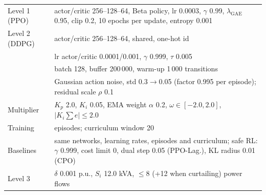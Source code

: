 \begin{tabular}{@{}l>{\raggedright\arraybackslash}p{}@{}}
\toprule
Level 1 (PPO) & actor/critic 256--128--64, Beta policy, lr 0.0003, $\gamma$ 0.99, $\lambda_{\mathrm{GAE}}$ 0.95, clip 0.2, 10 epochs per update, entropy 0.001 \\
Level 2 (DDPG) & actor/critic 256--128--64, shared, one-hot id \\
 & lr actor/critic 0.0001/0.001, $\gamma$ 0.999, $\tau$ 0.005 \\
 & batch 128, buffer 200\,000, warm-up 1\,000 transitions \\
 & Gaussian action noise, std 0.3$\to$0.05 (factor 0.995 per episode); residual scale $\rho$ 0.1 \\
Multiplier & $K_p$ 2.0, $K_i$ 0.05, EMA weight $\alpha$ 0.2, $\omega\in[-2.0, 2.0]$, $|K_i\textstyle\sum e|\le2.0$ \\
Training & 600 episodes; curriculum window 20 \\
Baselines & same networks, learning rates, episodes and curriculum; safe RL: $\gamma$ 0.999, cost limit 0, dual step 0.05 (PPO-Lag.), KL radius 0.01 (CPO) \\
Level 3 & $\delta$ 0.001 p.u., $S_i$ 12.0 kVA, $\le$8 (+12 when curtailing) power flows \\
\bottomrule
\end{tabular}
